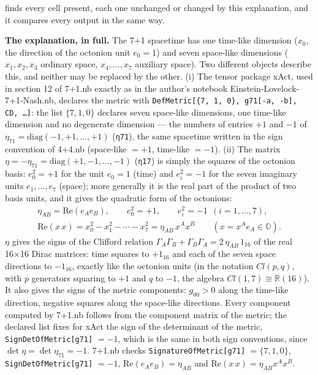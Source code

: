 \documentclass[10pt,a4paper]{article}
\begin{document}
finds every cell present, each one unchanged or changed by this explanation, and it compares every output in the same way.

\textbf{The explanation, in full.} The 7+1 spacetime has one time-like dimension ($x_0$, the direction of the octonion unit $e_0=1$) and seven space-like dimensions ($x_1,x_2,x_3$ ordinary space, $x_4,\dots,x_7$ auxiliary space). Two different objects describe this, and neither may be replaced by the other. (i) The tensor package xAct, used in section 12 of 7+1.nb exactly as in the author’s notebook Einstein-Lovelock-7+1-Nash.nb, declares the metric with \texttt{DefMetric[\{7, 1, 0\}, g71[-a, -b], CD, …]}: the list $\{7,1,0\}$ declares seven space-like dimensions, one time-like dimension and no degenerate dimension — the numbers of entries $+1$ and $-1$ of $\eta_{71}=\mathrm{diag}(-1,+1,\dots,+1)$ (\texttt{η71}), the same spacetime written in the sign convention of 4+4.nb (space-like $=+1$, time-like $=-1$). (ii) The matrix $\eta=-\eta_{71}=\mathrm{diag}(+1,-1,\dots,-1)$ (\texttt{η17}) is simply the squares of the octonion basis: $e_0^2=+1$ for the unit $e_0=1$ (time) and $e_i^2=-1$ for the seven imaginary units $e_1,\dots,e_7$ (space); more generally it is the real part of the product of two basis units, and it gives the quadratic form of the octonions:
\begin{gather*}
\eta_{AB}=\mathrm{Re}(e_Ae_B),\qquad e_0^2=+1,\qquad e_i^2=-1\ \ (i=1,\dots,7),\\ \mathrm{Re}(x\,x)=x_0^2-x_1^2-\cdots-x_7^2=\eta_{AB}\,x^Ax^B\qquad (x=x^Ae_A\in\mathbb O).
\end{gather*}
$\eta$ gives the signs of the Clifford relation $\Gamma_A\Gamma_B+\Gamma_B\Gamma_A=2\,\eta_{AB}\,1_{16}$ of the real 16×16 Dirac matrices: time squares to $+1_{16}$ and each of the seven space directions to $-1_{16}$, exactly like the octonion units (in the notation $Cl(p,q)$, with $p$ generators squaring to $+1$ and $q$ to $-1$, the algebra $Cl(1,7)\cong\mathbb R(16)$). It also gives the signs of the metric components: $g_{00}>0$ along the time-like direction, negative squares along the space-like directions. Every component computed by 7+1.nb follows from the component matrix of the metric; the declared list fixes for xAct the sign of the determinant of the metric, \texttt{SignDetOfMetric[g71]} $=-1$, which is the same in both sign conventions, since $\det \eta=\det \eta_{71}=-1$. 7+1.nb checks \texttt{SignatureOfMetric[g71]} $=\{7,1,0\}$, \texttt{SignDetOfMetric[g71]} $=-1$, $\mathrm{Re}(e_Ae_B)=\eta_{AB}$ and $\mathrm{Re}(x\,x)=\eta_{AB}x^Ax^B$.
\end{document}
